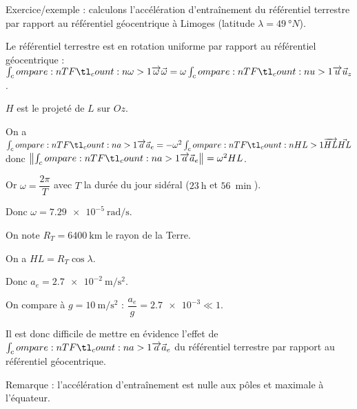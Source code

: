 Exercice/exemple : calculons l'accélération d'entraînement du référentiel terrestre par rapport au référentiel géocentrique à Limoges (latitude \(\lambda=\SI{49}{\degree}N\)).

\begin{center}
\end{center}

Le référentiel terrestre est en rotation uniforme par rapport au référentiel géocentrique : \(\v{\omega}=\omega\v{u}_z\).

\(H\) est le projeté de \(L\) sur \(Oz\).

On a \(\v{a}_e=-\omega^2\v{HL}\) donc \(\norme{\v{a}_e}=\omega^2HL\).

Or \(\omega=\dfrac{2\pi}{T}\) avec \(T\) la durée du jour sidéral (\(\SI{23}{\hour}\) et \(\SI{56}{\min}\)).

Donc \(\omega=\SI{7.29e-5}{\radian\per\second}\).

On note \(R_T=\SI{6400}{\kilo\metre}\) le rayon de la Terre.

On a \(HL=R_T\cos\lambda\).

Donc \(a_e=\SI{2.7e-2}{\metre\per\second\squared}\).

On compare à \(g=\SI{10}{\metre\per\second\squared}\) : \(\dfrac{a_e}{g}=\num{2.7e-3}\ll1\).

Il est donc difficile de mettre en évidence l'effet de \(\v{a}_e\) du référentiel terrestre par rapport au référentiel géocentrique.

Remarque : l'accélération d'entraînement est nulle aux pôles et maximale à l'équateur.

